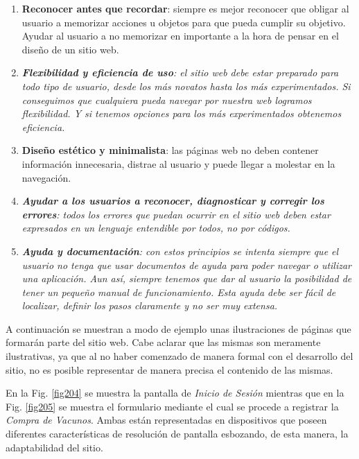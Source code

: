 \documentclass[11pt,oneside]{book}
\begin{document}
\begin{itemize}
\begin{enumerate}
\item \textbf{Reconocer antes que recordar}: siempre es mejor reconocer que obligar al usuario a memorizar acciones u objetos para que pueda cumplir su objetivo. Ayudar al usuario a no memorizar en importante a la hora de pensar en el diseño de un sitio web.

\item \textit{\textbf{Flexibilidad y eficiencia de uso}: el sitio web debe estar preparado para todo tipo de usuario, desde los más novatos hasta los más experimentados. Si conseguimos que cualquiera pueda navegar por nuestra web logramos flexibilidad. Y si tenemos opciones para los más experimentados obtenemos eficiencia.}

\item \textbf{Diseño estético y minimalista}: las páginas web no deben contener información innecesaria, distrae al usuario y puede llegar a molestar en la navegación.

\item \textit{\textbf{Ayudar a los usuarios a reconocer, diagnosticar y corregir los errores}: todos los errores que puedan ocurrir en el sitio web deben estar expresados en un lenguaje entendible por todos, no por códigos.}

\item \textit{\textbf{Ayuda y documentación}: con estos principios se intenta siempre que el usuario no tenga que usar documentos de ayuda para poder navegar o utilizar una aplicación. Aun así, siempre tenemos que dar al usuario  la posibilidad de tener un pequeño manual de funcionamiento. Esta ayuda debe ser fácil de localizar, definir los pasos claramente y no ser muy extensa.}
\end{enumerate}
\end{itemize}

A continuación se muestran a modo de ejemplo unas ilustraciones de páginas que formarán parte del sitio web. Cabe aclarar que las mismas son meramente ilustrativas, ya que al no haber comenzado de manera formal con el desarrollo del sitio, no es posible representar de manera precisa el contenido de las mismas.

En la Fig. \eqref{fig204} se muestra la pantalla de \textit{Inicio de Sesión} mientras que en la Fig. \eqref{fig205} se muestra el formulario mediante el cual se procede a registrar la \textit{Compra de Vacunos}. Ambas están representadas en dispositivos que poseen diferentes características de resolución de pantalla esbozando, de esta manera, la adaptabilidad del sitio.
\end{document}
